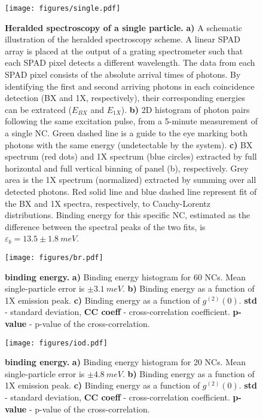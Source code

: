 \documentclass[journal=nalefd, manuscript=letter, layout=twocolumn]{achemso}
\begin{document}
\begin{figure*}[t]
    \centering
    \texttt{[image: figures/single.pdf]}
    \caption{
    \textbf{Heralded spectroscopy of a single particle.} 
    \textbf{a)} A schematic illustration of the heralded spectroscopy scheme. A linear SPAD array is placed at the output of a grating spectrometer such that each SPAD pixel detects a different wavelength. The data from each SPAD pixel consists of the absolute arrival times of photons. By identifying the first and second arriving photons in each coincidence detection (BX and 1X, respectively), their corresponding energies can be extratced ($E_{BX}$ and $E_{1X}$). 
    \textbf{b)} 2D histogram of photon pairs following the same excitation pulse, from a 5-minute measurement of a single  NC. Green dashed line is a guide to the eye marking both photons with the same energy (undetectable by the system).
    \textbf{c)} BX spectrum (red dots) and 1X spectrum (blue circles) extracted by full horizontal and full vertical binning of panel (b), respectively. Grey area is the 1X spectrum (normalized) extracted by summing over all detected photons. Red solid line and blue dashed line represent fit of the BX and 1X spectra, respectively, to Cauchy-Lorentz distributions. Binding energy for this specific NC, estimated as the difference between the spectral peaks of the two fits, is $\varepsilon_b = 13.5\pm\SI{1.8}{meV}$.
    }
    \label{fig:single}
\end{figure*}

\begin{figure}[t]
    \centering
    \texttt{[image: figures/br.pdf]}
    \caption{
    \textbf{ binding energy.} 
    \textbf{a)} Binding energy histogram for 60 NCs. Mean single-particle error is $\pm\SI{3.1}{meV}$. 
    \textbf{b)} Binding energy as a function of 1X emission peak. 
    \textbf{c)} Binding energy as a function of $g^{(2)}(0)$. 
    \textbf{std} - standard deviation, \textbf{CC coeff} - cross-correlation coefficient. \textbf{p-value} - p-value of the cross-correlation.
    }
    \label{fig:br}
\end{figure}

\begin{figure}[t]
    \centering
    \texttt{[image: figures/iod.pdf]}
    \caption{
    \textbf{ binding energy.} 
    \textbf{a)} Binding energy histogram for 20 NCs. Mean single-particle error is $\pm\SI{4.8}{meV}$. 
    \textbf{b)} Binding energy as a function of 1X emission peak. 
    \textbf{c)} Binding energy as a function of $g^{(2)}(0)$. 
    \textbf{std} - standard deviation, \textbf{CC coeff} - cross-correlation coefficient. \textbf{p-value} - p-value of the cross-correlation.
    }
    \label{fig:iod}
\end{figure}
\end{document}

